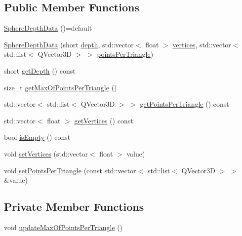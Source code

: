 \subsection*{Public Member Functions}
\begin{DoxyCompactItemize}
\item 
\hyperlink{struct_sphere_depth_data_adf3b418ea38626e3d768240d257504ea}{Sphere\+Depth\+Data} ()=default
\item 
\hyperlink{struct_sphere_depth_data_a746de4be5c4ff2bdcbdc1517aa88a4d9}{Sphere\+Depth\+Data} (short \hyperlink{struct_sphere_depth_data_a32dc63866d12b3102942e14bb28238ff}{depth}, std\+::vector$<$ float $>$ \hyperlink{struct_sphere_depth_data_a139a9131aa15308e012fc8190de2011d}{vertices}, std\+::vector$<$ std\+::list$<$ Q\+Vector3D $>$ $>$ \hyperlink{struct_sphere_depth_data_a9decfacc00300c153ecff80288b7413f}{points\+Per\+Triangle})
\item 
short \hyperlink{struct_sphere_depth_data_a925a7e0a5486b49151d823471ebe7fe6}{get\+Depth} () const
\item 
size\+\_\+t \hyperlink{struct_sphere_depth_data_a8794f19983ff01aaa21d7e4d46ae6615}{get\+Max\+Of\+Points\+Per\+Triangle} ()
\item 
std\+::vector$<$ std\+::list$<$ Q\+Vector3D $>$ $>$ \hyperlink{struct_sphere_depth_data_af42bd1ede7948a735367755a61148adc}{get\+Points\+Per\+Triangle} () const
\item 
std\+::vector$<$ float $>$ \hyperlink{struct_sphere_depth_data_adab658de163c515ec9a41a70300a0af9}{get\+Vertices} () const
\item 
bool \hyperlink{struct_sphere_depth_data_acdda270334d050e23b82ad0f700c5c1c}{is\+Empty} () const
\item 
void \hyperlink{struct_sphere_depth_data_a95e070bea3d8ec4a0449044e4616208f}{set\+Vertices} (std\+::vector$<$ float $>$ value)
\item 
void \hyperlink{struct_sphere_depth_data_ac0d61e109f98ac7c5b7f4ea7381bc963}{set\+Points\+Per\+Triangle} (const std\+::vector$<$ std\+::list$<$ Q\+Vector3D $>$ $>$ \&value)
\end{DoxyCompactItemize}
\subsection*{Private Member Functions}
\begin{DoxyCompactItemize}
\item 
void \hyperlink{struct_sphere_depth_data_abd8824844f88cc2b9b794c6586f5b30c}{update\+Max\+Of\+Points\+Per\+Triangle} ()
\end{DoxyCompactItemize}
